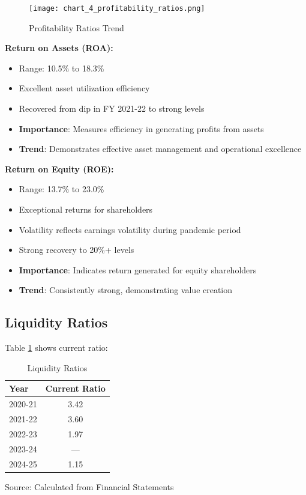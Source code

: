 \documentclass[8pt,a4paper]{article}
\begin{document}
\begin{figure}[H]
\centering
\texttt{[image: chart\_4\_profitability\_ratios.png]}
\caption{Profitability Ratios Trend}
\label{fig:assets_growth}
\end{figure}

\textbf{Return on Assets (ROA):}
\begin{itemize}
    \item Range: 10.5\% to 18.3\%
    \item Excellent asset utilization efficiency
    \item Recovered from dip in FY 2021-22 to strong levels
    \item \textbf{Importance}: Measures efficiency in generating profits from assets
    \item \textbf{Trend}: Demonstrates effective asset management and operational excellence
\end{itemize}

\textbf{Return on Equity (ROE):}
\begin{itemize}
    \item Range: 13.7\% to 23.0\%
    \item Exceptional returns for shareholders
    \item Volatility reflects earnings volatility during pandemic period
    \item Strong recovery to 20\%+ levels
    \item \textbf{Importance}: Indicates return generated for equity shareholders
    \item \textbf{Trend}: Consistently strong, demonstrating value creation
\end{itemize}

\subsection{Liquidity Ratios}

Table \ref{tab:liquidity_ratios} shows current ratio:

\begin{table}[H]
\centering
\caption{Liquidity Ratios}
\label{tab:liquidity_ratios}
\begin{tabular}{lc}
\toprule
\textbf{Year} & \textbf{Current Ratio} \\
\midrule
2020-21 & 3.42 \\
2021-22 & 3.60 \\
2022-23 & 1.97 \\
2023-24 & --- \\
2024-25 & 1.15 \\
\bottomrule
\end{tabular}

\footnotesize
Source: Calculated from Financial Statements
\end{table}
\end{document}
